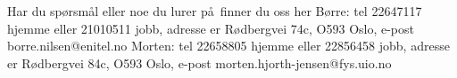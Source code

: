 \documentclass[12pt]{article}
\begin{document}
Har du sp\o rsm\aa l eller noe du lurer p\aa\ finner du oss her\newline
B\o rre: tel 22647117 hjemme  eller 21010511 jobb, adresse er
R\o dbergvei 74c, O593 Oslo, e-post borre.nilsen@enitel.no\newline
Morten: tel 22658805 hjemme eller 22856458 jobb, adresse er
R\o dbergvei 84c, O593 Oslo, e-post morten.hjorth-jensen@fys.uio.no
\end{document}
